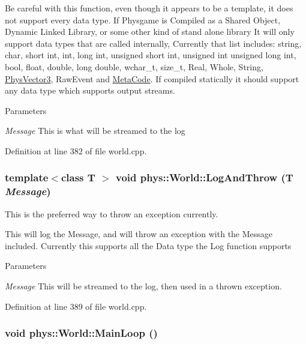 Be careful with this function, even though it appears to be a template, it does not support every data type. If Physgame is Compiled as a Shared Object, Dynamic Linked Library, or some other kind of stand alone library It will only support data types that are called internally, Currently that list includes: string, char, short int, int, long int, unsigned short int, unsigned int unsigned long int, bool, float, double, long double, wchar\_\-t, size\_\-t, Real, Whole, String, \hyperlink{classPhysVector3}{PhysVector3}, RawEvent and \hyperlink{classphys_1_1MetaCode}{MetaCode}. If compiled statically it should support any data type which supports output streams. 
\begin{DoxyParams}{Parameters}
\item[{\em Message}]This is what will be streamed to the log \end{DoxyParams}


Definition at line 382 of file world.cpp.

\hypertarget{classphys_1_1World_a88e6bdee6b972111b6804ca746738c50}{
\subsubsection[{LogAndThrow}]{\setlength{\rightskip}{0pt plus 5cm}template$<$class T $>$ void phys::World::LogAndThrow (T {\em Message})}}
\label{da/ddf/classphys_1_1World_a88e6bdee6b972111b6804ca746738c50}


This is the preferred way to throw an exception currently. 

This will log the Message, and will throw an exception with the Message included. Currently this supports all the Data type the Log function supports 
\begin{DoxyParams}{Parameters}
\item[{\em Message}]This will be streamed to the log, then used in a thrown exception. \end{DoxyParams}


Definition at line 389 of file world.cpp.

\hypertarget{classphys_1_1World_af1d9e36d43f5e50543fa2351a32c8362}{
\subsubsection[{MainLoop}]{\setlength{\rightskip}{0pt plus 5cm}void phys::World::MainLoop ()}}
\label{da/ddf/classphys_1_1World_af1d9e36d43f5e50543fa2351a32c8362}


